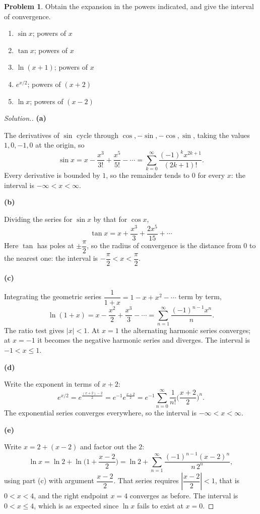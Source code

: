 \documentclass[11pt,a4paper]{article}
\theoremstyle{definition}
\newtheorem{problemx}{Problem}[subsection]
\newenvironment{problem}{\begin{problemx}}{\end{problemx}}
\newenvironment{solution}
  {\renewcommand{\qedsymbol}{}\begin{proof}[\textit{Solution}.]}
  {\end{proof}}
\newcommand{\subhead}[1]{%
  \par\medskip\noindent\textbf{#1}\par\nobreak\smallskip}
\begin{document}
\begin{problem}
Obtain the expansion in the powers indicated, and give the interval of
convergence.
\begin{enumerate}
\item[(a)] $\sin x$; powers of $x$
\item[(b)] $\tan x$; powers of $x$
\item[(c)] $\ln(x+1)$; powers of $x$
\item[(d)] $e^{x/2}$; powers of $(x+2)$
\item[(e)] $\ln x$; powers of $(x-2)$
\end{enumerate}
\end{problem}
\begin{solution}
\subhead{(a)}
The derivatives of $\sin$ cycle through $\cos, -\sin, -\cos, \sin$, taking the
values $1,0,-1,0$ at the origin, so
$$\sin x = x - \frac{x^3}{3!} + \frac{x^5}{5!} - \cdots
= \sum_{k=0}^{\infty}\frac{(-1)^kx^{2k+1}}{(2k+1)!}.$$
Every derivative is bounded by $1$, so the remainder tends to $0$ for every $x$:
the interval is $-\infty<x<\infty$.

\subhead{(b)}
Dividing the series for $\sin x$ by that for $\cos x$,
$$\tan x = x + \frac{x^3}{3} + \frac{2x^5}{15} + \cdots$$
Here $\tan$ has poles at $\pm\dfrac{\pi}{2}$, so the radius of convergence is
the distance from $0$ to the nearest one: the interval is
$-\dfrac{\pi}{2}<x<\dfrac{\pi}{2}$.

\subhead{(c)}
Integrating the geometric series
$\dfrac{1}{1+x} = 1-x+x^2-\cdots$ term by term,
$$\ln(1+x) = x - \frac{x^2}{2} + \frac{x^3}{3} - \cdots
= \sum_{n=1}^{\infty}\frac{(-1)^{n-1}x^n}{n}.$$
The ratio test gives $\left|x\right|<1$. At $x=1$ the alternating harmonic
series converges; at $x=-1$ it becomes the negative harmonic series and
diverges. The interval is $-1<x\leq 1$.

\subhead{(d)}
Write the exponent in terms of $x+2$:
$$e^{x/2} = e^{\frac{(x+2)-2}{2}} = e^{-1}e^{\frac{x+2}{2}}
= e^{-1}\sum_{n=0}^{\infty}\frac{1}{n!}\Big(\frac{x+2}{2}\Big)^n .$$
The exponential series converges everywhere, so the interval is
$-\infty<x<\infty$.

\subhead{(e)}
Write $x = 2 + (x-2)$ and factor out the $2$:
$$\ln x = \ln 2 + \ln\Big(1+\frac{x-2}{2}\Big)
= \ln 2 + \sum_{n=1}^{\infty}\frac{(-1)^{n-1}(x-2)^n}{n\,2^n},$$
using part (c) with argument $\dfrac{x-2}{2}$. That series requires
$\left|\dfrac{x-2}{2}\right|<1$, that is $0<x<4$, and the right endpoint $x=4$
converges as before. The interval is $0<x\leq 4$, which is as expected since
$\ln x$ fails to exist at $x=0$.
\end{solution}
\end{document}
